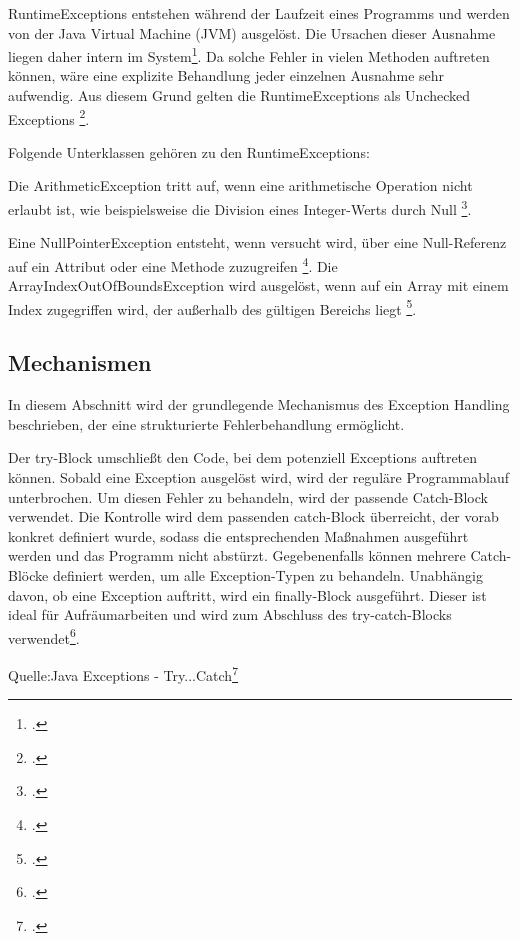 RuntimeExceptions entstehen während der Laufzeit eines Programms und werden von der Java Virtual Machine (JVM) ausgelöst. Die Ursachen dieser Ausnahme liegen daher intern im System\footcite[Vgl. ][S. 517]{1Dev_Exp_Hand}. Da solche Fehler in vielen Methoden auftreten können, wäre eine explizite Behandlung jeder einzelnen Ausnahme sehr aufwendig. Aus diesem Grund gelten die RuntimeExceptions als Unchecked Exceptions \footcite[Vgl.][S. 9]{3Exp_Hand_a}.

Folgende Unterklassen gehören zu den RuntimeExceptions:

Die ArithmeticException tritt auf, wenn eine arithmetische Operation nicht erlaubt ist, wie beispielsweise die Division eines Integer-Werts durch Null \footcite[Vgl.][S. 9]{3Exp_Hand_a}.

Eine NullPointerException entsteht, wenn versucht wird, über eine Null-Referenz auf ein Attribut oder eine Methode zuzugreifen \footcite[Vgl.][S. 9]{3Exp_Hand_a}.
Die ArrayIndexOutOfBoundsException wird ausgelöst, wenn auf ein Array mit einem Index zugegriffen wird, der außerhalb des gültigen Bereichs liegt \footcite[Vgl.][]{4Exp_Hand_b}.

\subsection{Mechanismen}
In diesem Abschnitt wird der grundlegende Mechanismus des Exception Handling beschrieben, der eine strukturierte Fehlerbehandlung ermöglicht.
 
Der try-Block umschließt den Code, bei dem potenziell Exceptions auftreten können. Sobald eine Exception ausgelöst wird, wird der reguläre Programmablauf unterbrochen. Um diesen Fehler zu behandeln, wird der passende Catch-Block verwendet. Die Kontrolle wird dem passenden catch-Block überreicht, der vorab konkret definiert wurde, sodass die entsprechenden Maßnahmen ausgeführt werden und das Programm nicht abstürzt. Gegebenenfalls können mehrere Catch-Blöcke definiert werden, um alle Exception-Typen zu behandeln. Unabhängig davon, ob eine Exception auftritt, wird ein finally-Block ausgeführt. Dieser ist ideal für Aufräumarbeiten und wird zum Abschluss des try-catch-Blocks verwendet\footcite[Vgl. ][]{4Exp_Hand_b, 2_TCJ}. 


\begin{center}
    \begin{small}
        Quelle:Java Exceptions - Try...Catch\footcite[][]{2_TCJ}
    \end{small}
\end{center} 
\clearpage


